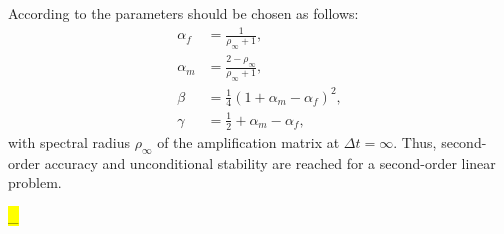 According to \citet{10_PF_genAlpha} the parameters should be chosen as follows:
\begin{equation}
	\begin{aligned}
		\alpha_{f} &= \frac{1}{\rho_{\infty}+1}, \\
		\alpha_{m} &= \frac{2-\rho_{\infty}}{\rho_{\infty}+1}, \\
		\beta &= \frac{1}{4}\left(1+\alpha_{m}-\alpha_{f}\right)^{2}, \\
		\gamma &= \frac{1}{2}+\alpha_{m}-\alpha_{f},
	\end{aligned}
\end{equation}
with spectral radius $\rho_{\infty}$ of the amplification matrix at $\Delta t=\infty$. Thus, second-order accuracy and unconditional stability are reached for a second-order linear problem. 

\hl{ \rho_{\infty} }
